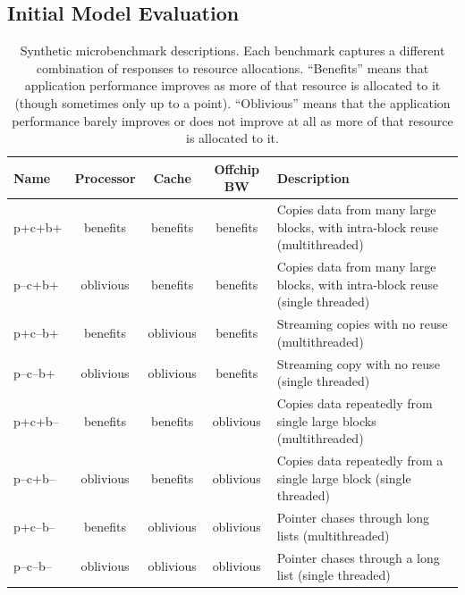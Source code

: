 \subsection{Initial Model Evaluation}
\label{init_eval}

\begin{table}[t]
\begin{tabular}{|l|c|c|c|l|}
\hline
 Name  & Processor  &  Cache &  Offchip BW & Description \\ \hline
 p+c+b+ & benefits & benefits & benefits &  Copies data from many large blocks, with intra-block reuse (multithreaded)\\ \hline
p--c+b+ & oblivious & benefits & benefits &  Copies data from many large blocks, with intra-block reuse (single threaded)\\ \hline
p+c--b+ & benefits & oblivious & benefits &  Streaming copies with no reuse (multithreaded)\\ \hline
p--c--b+ & oblivious & oblivious & benefits &  Streaming copy with no reuse (single threaded)\\ \hline
p+c+b-- & benefits & benefits & oblivious &  Copies data repeatedly from single large blocks (multithreaded)\\ \hline
p--c+b-- & oblivious & benefits & oblivious &  Copies data repeatedly from a single large block (single threaded)\\ \hline
p+c--b-- & benefits & oblivious & oblivious &  Pointer chases through long lists (multithreaded)\\ \hline
p--c--b-- & oblivious & oblivious & oblivious &  Pointer chases through a long list (single threaded)\\ \hline
\end{tabular}
\caption{Synthetic microbenchmark descriptions. Each benchmark captures a different combination of responses to resource allocations.  ``Benefits'' means that application performance improves as more of that resource is allocated to it (though sometimes only up to a point).  ``Oblivious'' means that the application performance barely improves or does not improve at all as more of that resource is allocated to it.}
\label{table:benchmarks}
\end{table}

